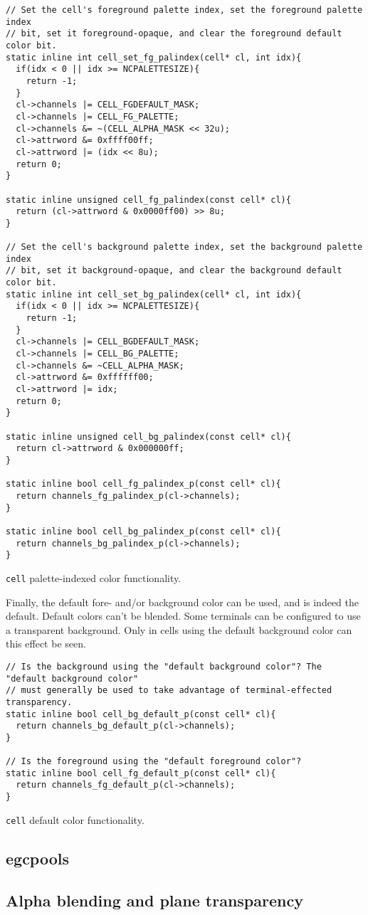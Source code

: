 \begin{listing}[!htbp]
\begin{verbatim}
// Set the cell's foreground palette index, set the foreground palette index
// bit, set it foreground-opaque, and clear the foreground default color bit.
static inline int cell_set_fg_palindex(cell* cl, int idx){
  if(idx < 0 || idx >= NCPALETTESIZE){
    return -1;
  }
  cl->channels |= CELL_FGDEFAULT_MASK;
  cl->channels |= CELL_FG_PALETTE;
  cl->channels &= ~(CELL_ALPHA_MASK << 32u);
  cl->attrword &= 0xffff00ff;
  cl->attrword |= (idx << 8u);
  return 0;
}

static inline unsigned cell_fg_palindex(const cell* cl){
  return (cl->attrword & 0x0000ff00) >> 8u;
}

// Set the cell's background palette index, set the background palette index
// bit, set it background-opaque, and clear the background default color bit.
static inline int cell_set_bg_palindex(cell* cl, int idx){
  if(idx < 0 || idx >= NCPALETTESIZE){
    return -1;
  }
  cl->channels |= CELL_BGDEFAULT_MASK;
  cl->channels |= CELL_BG_PALETTE;
  cl->channels &= ~CELL_ALPHA_MASK;
  cl->attrword &= 0xffffff00;
  cl->attrword |= idx;
  return 0;
}

static inline unsigned cell_bg_palindex(const cell* cl){
  return cl->attrword & 0x000000ff;
}

static inline bool cell_fg_palindex_p(const cell* cl){
  return channels_fg_palindex_p(cl->channels);
}

static inline bool cell_bg_palindex_p(const cell* cl){
  return channels_bg_palindex_p(cl->channels);
}
\end{verbatim}
\caption{\texttt{cell} palette-indexed color functionality.}
\label{listing:cellpalette}
\end{listing}

Finally, the default fore- and/or background color can be used, and is indeed
the default. Default colors can't be blended. Some terminals can be configured
to use a transparent background. Only in cells using the default background
color can this effect be seen.

\begin{listing}[!htbp]
\begin{verbatim}
// Is the background using the "default background color"? The "default background color"
// must generally be used to take advantage of terminal-effected transparency.
static inline bool cell_bg_default_p(const cell* cl){
  return channels_bg_default_p(cl->channels);
}

// Is the foreground using the "default foreground color"?
static inline bool cell_fg_default_p(const cell* cl){
  return channels_fg_default_p(cl->channels);
}
\end{verbatim}
\caption{\texttt{cell} default color functionality.}
\end{listing}

\subsection{egcpools}
\label{sec:egcpools}

\subsection{Alpha blending and plane transparency}
